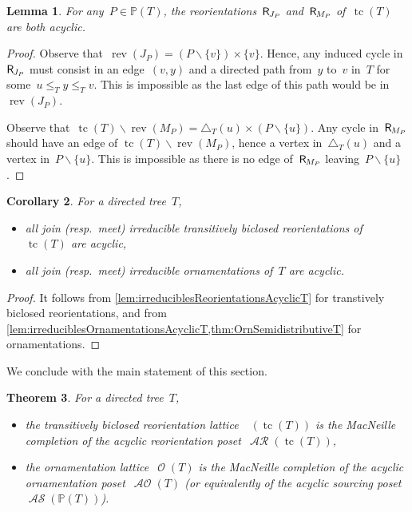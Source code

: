 \documentclass{amsart}
\newtheorem{theorem}{Theorem}[section]
\newtheorem{corollary}[theorem]{Corollary}
\newtheorem{lemma}[theorem]{Lemma}
\theoremstyle{definition}
\renewcommand{\c}[1]{\mathcal{#1}} %
\newcommand{\ssm}{\smallsetminus} %
\DeclareMathOperator{\tc}{tc} %
\newcommand{\mymap}[2]{\mathsf{#1}_{\hspace{-.7pt}#2}}
\DeclareMathOperator{\Orn}{\c{O}}  %
\DeclareMathOperator{\AOrn}{\c{AO}}  %
\newcommand{\reori}[1]{\mymap{R}{#1}}  %
\DeclareMathOperator{\AReori}{\c{AR}}  %
\DeclareMathOperator{\Rbi}{\c{R}^{bi}}  %
\DeclareMathOperator{\rev}{rev} %
\DeclareMathOperator{\ASour}{\mathcal{AS}}  %
\newcommand{\PP}{\mathbb P} %
\begin{document}
\begin{lemma}
\label{lem:irreduciblesOrnamentationsAcyclicT}
For any~$P \in \PP(T)$, the reorientations~$\reori{J_P}$ and~$\reori{M_P}$ of~$\tc(T)$ are both acyclic.
\end{lemma}

\begin{proof}
Observe that~$\rev(J_P) = (P \ssm \{v\}) \times \{v\}$.
Hence, any induced cycle in~$\reori{J_P}$ must consist in an edge~$(v,y)$ and a directed path from~$y$ to~$v$ in~$T$ for some~$u \le_T y \le_T v$.
This is impossible as the last edge of this path would be in~$\rev(J_P)$.

Observe that~$\tc(T) \ssm \rev(M_P) = \triangle_T(u) \times (P \ssm \{u\})$.
Any cycle in~$\reori{M_P}$ should have an edge of $\tc(T) \ssm \rev(M_P)$, hence a vertex in~$\triangle_T(u)$ and a vertex in~$P \ssm \{u\}$.
This is impossible as there is no edge of~$\reori{M_P}$ leaving~$P \ssm \{u\}$.
\end{proof}

\begin{corollary}
\label{coro:irreduciblesAcyclicT}
For a directed tree~$T$, 
\begin{itemize}
\item all join (resp.~meet) irreducible transitively biclosed reorientations of~$\tc(T)$ are acyclic,
\item all join (resp.~meet) irreducible ornamentations of~$T$ are acyclic.
\end{itemize}
\end{corollary}

\begin{proof}
It follows from \cref{lem:irreduciblesReorientationsAcyclicT} for transtively biclosed reorientations, and from \cref{lem:irreduciblesOrnamentationsAcyclicT,thm:OrnSemidistributiveT} for ornamentations.
\end{proof}

We conclude with the main statement of this section.

\begin{theorem}
\label{thm:MacNeille}
For a directed tree~$T$, 
\begin{itemize}
\item the transitively biclosed reorientation lattice~$\Rbi(\tc(T))$ is the MacNeille completion of the acyclic reorientation poset~$\AReori(\tc(T))$,
\item the ornamentation lattice~$\Orn(T)$ is the MacNeille completion of the acyclic ornamentation poset~$\AOrn(T)$ (or equivalently of the acyclic sourcing poset~$\ASour(\PP(T))$).
\end{itemize}
\end{theorem}
\end{document}
